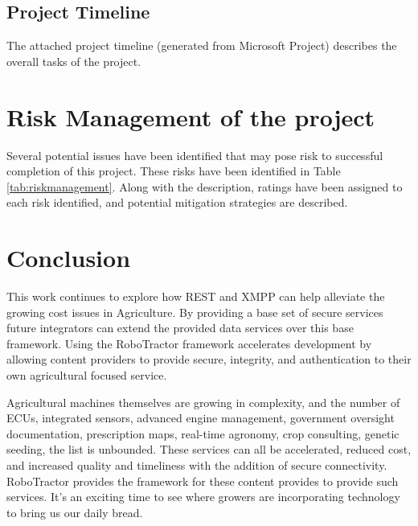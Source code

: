 \documentclass[conference,12pt]{IEEEtran}
\begin{document}
\subsection{Project Timeline}
The attached project timeline (generated from Microsoft Project) describes the
overall tasks of the project.

\section{Risk Management of the project}
Several potential issues have been identified that may pose risk to successful
completion of this project. These risks have been identified in Table
\ref{tab:riskmanagement}. Along with the description, ratings have been assigned
to each risk identified, and potential mitigation strategies are described.

\section{Conclusion}
This work continues to explore how REST and XMPP can help alleviate the growing
cost issues in Agriculture. By providing a base set of secure services future
integrators can extend the provided data services over this base framework.
Using the RoboTractor framework accelerates development by allowing content
providers to provide secure, integrity, and authentication to their own
agricultural focused service. 

Agricultural machines themselves are growing in complexity, and the number of ECUs,
integrated sensors, advanced engine management, government oversight
documentation, prescription maps, real-time agronomy, crop consulting, genetic
seeding, the list is unbounded. These services can all be accelerated, reduced
cost, and increased quality and timeliness with the addition of secure
connectivity. RoboTractor provides the framework for these content provides to
provide such services. It's an exciting time to see where growers are
incorporating technology to bring us our daily bread.
\end{document}
